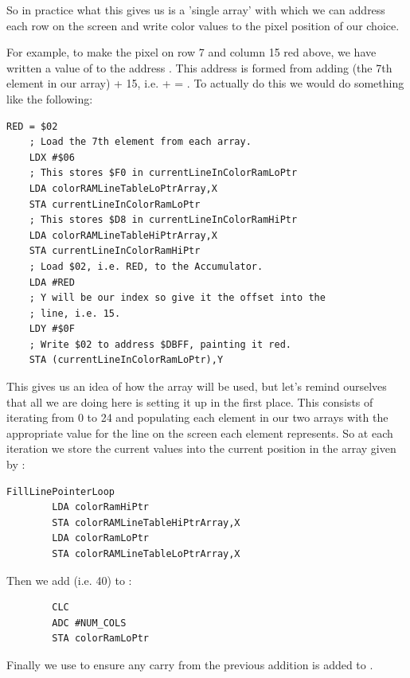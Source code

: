 {So in practice what this gives us is a 'single array' with which we can address each row on the screen and write color values
to the pixel position of our choice.



For example, to make the pixel on row 7 and column 15 red above, we have written a value of  to the address . This 
address is
formed from adding  (the 7th element in our array) + 15, i.e.  +  = . 
To actually do this we would do something like the following:
 
\begin{lstlisting}[basicstyle=\ttfamily\scriptsize]
    RED = $02
    ; Load the 7th element from each array.
    LDX #$06
    ; This stores $F0 in currentLineInColorRamLoPtr
    LDA colorRAMLineTableLoPtrArray,X
    STA currentLineInColorRamLoPtr
    ; This stores $D8 in currentLineInColorRamHiPtr
    LDA colorRAMLineTableHiPtrArray,X
    STA currentLineInColorRamHiPtr
    ; Load $02, i.e. RED, to the Accumulator. 
    LDA #RED
    ; Y will be our index so give it the offset into the
    ; line, i.e. 15. 
    LDY #$0F
    ; Write $02 to address $DBFF, painting it red.
    STA (currentLineInColorRamLoPtr),Y
\end{lstlisting}

This gives us an idea of how the array will be used, but let's remind ourselves that all we are doing here is setting
it up in the first place. This consists of iterating from 0 to 24 and populating each element in our two arrays with
the appropriate value for the line on the screen each element represents. So at each iteration we store
the current values into the current position in the array given by :

\begin{lstlisting}
FillLinePointerLoop
        LDA colorRamHiPtr
        STA colorRAMLineTableHiPtrArray,X
        LDA colorRamLoPtr
        STA colorRAMLineTableLoPtrArray,X
\end{lstlisting}

Then we add   (i.e. 40) to : 

\begin{lstlisting}
        CLC 
        ADC #NUM_COLS
        STA colorRamLoPtr
\end{lstlisting}

Finally we use  to ensure any carry from the previous addition is added to . 

}
